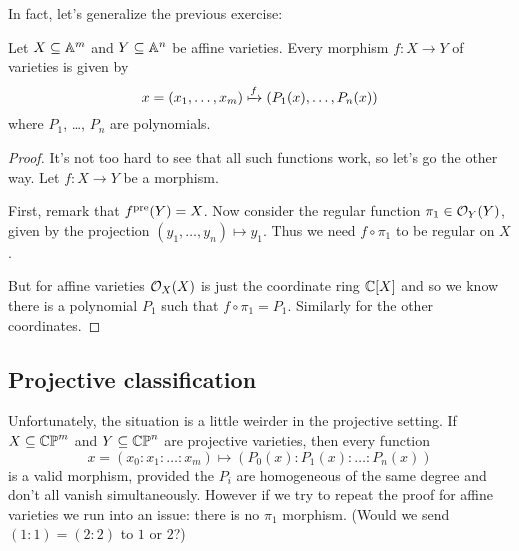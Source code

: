 In fact, let's generalize the previous exercise:
\begin{theorem}
	Let $X \subseteq \mathbb A^m$ and $Y \subseteq \mathbb A^n$ be affine varieties.
	Every morphism $f \colon X \to Y$ of varieties is given by
	\[
		x = \left( x_1, \dots, x_m \right)
		\xmapsto{f} \left( P_1(x), \dots, P_n(x) \right)
	\]
	where $P_1$, \dots, $P_n$ are polynomials.
	\label{thm:affine_global_polynomial}
\end{theorem}
\begin{proof}
	It's not too hard to see that all such functions work,
	so let's go the other way.
	Let $f \colon X \to Y$ be a morphism.

	First, remark that $f^{\text{pre}}(Y) = X$.
	Now consider the regular function $\pi_1 \in \mathcal O_Y(Y)$,
	given by the projection $(y_1, \dots, y_n) \mapsto y_1$.
	Thus we need $f \circ \pi_1$ to be regular on $X$.

	But for affine varieties $\mathcal O_X(X)$ is just the coordinate ring $\mathbb C[X]$
	and so we know there is a polynomial $P_1$ such that $f \circ \pi_1 = P_1$.
	Similarly for the other coordinates.
\end{proof}

\subsection{Projective classification}
Unfortunately, the situation is a little weirder in the projective setting.
If $X \subseteq \mathbb{CP}^m$ and $Y \subseteq \mathbb{CP}^n$ are projective varieties,
then every function
\[
	x = \left( x_0 : x_1 : \dots : x_m \right)
	\mapsto \left( P_0(x) : P_1(x) : \dots : P_n(x) \right)
\]
is a valid morphism, provided the $P_i$ are homogeneous
of the same degree and don't all vanish simultaneously.
However if we try to repeat the proof for affine varieties
we run into an issue: there is no $\pi_1$ morphism.
(Would we send $(1:1) = (2:2)$ to $1$ or $2$?)

